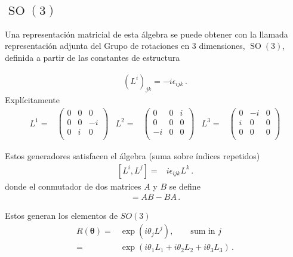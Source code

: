 \subsection{$\operatorname{SO}(3)$}
Una representación matricial de esta álgebra se puede obtener con la llamada representación adjunta del Grupo de rotaciones en 3 dimensiones, $\operatorname{SO}(3)$, definida a partir de las constantes de estructura \cite{Veltman}
\begin{frame}
\begin{align}
  \label{eq:so3adj}
  (L^i)_{jk}=-i\epsilon_{ijk}\,.
\end{align}
Explícitamente
\begin{align*}
  L^1=&
  \begin{pmatrix}
   0 & 0 & 0\\
   0 & 0 & -i\\
   0 & i & 0 \\
  \end{pmatrix}&
 L^2=&
 \begin{pmatrix}
  0 & 0  & i \\ 
  0 & 0  & 0 \\
 -i & 0  & 0 \\
 \end{pmatrix}&
 L^3=&
 \begin{pmatrix}
   0 & -i & 0\\
   i & 0  & 0\\
   0 & 0 & 0\\
 \end{pmatrix}
\end{align*}

Estos generadores satisfacen el álgebra (suma sobre índices repetidos)
\begin{align}
  \left[ L^i,L^j \right]=& i \epsilon_{ijk}L^{k}\,.
\end{align}
donde el conmutador de dos matrices $A$ y $B$ se define
\begin{align}
  [A,B]=AB-BA\,.
\end{align}
\end{frame}
Estos generan los elementos de $SO(3)$
\begin{align}
  R(\boldsymbol{\theta})=&\exp(i \theta_j L^{j}),\qquad\text{sum in $j$}\nonumber\\
                 =&\exp(i\theta_1 L_1+i\theta_2 L_2+i\theta_3 L_3)\,.
\end{align}

